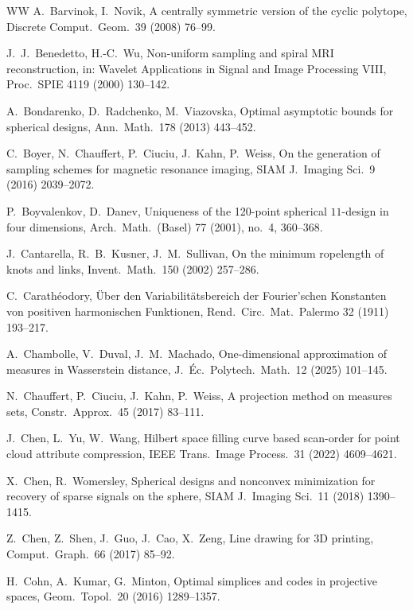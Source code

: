 \documentclass[12pt]{article}
\theoremstyle{plain}
\theoremstyle{definition}
\theoremstyle{remark}
\begin{document}
\begin{thebibliography}{WW}
A.\ Barvinok, I.\ Novik,
A centrally symmetric version of the cyclic polytope,
Discrete Comput.\ Geom.\ 39 (2008) 76--99.


J.\ J.\ Benedetto, H.-C.\ Wu,
Non-uniform sampling and spiral MRI reconstruction,
in: Wavelet Applications in Signal and Image Processing VIII,
Proc.\ SPIE 4119 (2000) 130--142.

A.\ Bondarenko, D.\ Radchenko, M.\ Viazovska,
Optimal asymptotic bounds for spherical designs,
Ann.\ Math.\ 178 (2013) 443--452.

C.\ Boyer, N.\ Chauffert, P.\ Ciuciu, J.\ Kahn, P.\ Weiss,
On the generation of sampling schemes for magnetic resonance imaging,
SIAM J.\ Imaging Sci.\ 9 (2016) 2039--2072.

P.\ Boyvalenkov, D.\ Danev,
Uniqueness of the 120-point spherical \(11\)-design in four dimensions,
Arch.\ Math.\ (Basel) 77 (2001), no.\ 4, 360--368.

J.\ Cantarella, R.\ B.\ Kusner, J.\ M.\ Sullivan,
On the minimum ropelength of knots and links,
Invent.\ Math.\ 150 (2002) 257--286.

C.\ Carath{\'e}odory,
\"Uber den Variabilit{\"a}tsbereich der Fourier'schen Konstanten von positiven harmonischen Funktionen,
Rend.\ Circ.\ Mat.\ Palermo 32 (1911) 193--217.

A.\ Chambolle, V.\ Duval, J.\ M.\ Machado,
One-dimensional approximation of measures in Wasserstein distance,
J.\ \'Ec.\ Polytech.\ Math.\ 12 (2025) 101--145.

N.\ Chauffert, P.\ Ciuciu, J.\ Kahn, P.\ Weiss,
A projection method on measures sets,
Constr.\ Approx.\ 45 (2017) 83--111.

J.\ Chen, L.\ Yu, W.\ Wang,
Hilbert space filling curve based scan-order for point cloud attribute compression,
IEEE Trans.\ Image Process.\ 31 (2022) 4609--4621.

X.\ Chen, R.\ Womersley,
Spherical designs and nonconvex minimization for recovery of sparse signals on the sphere,
SIAM J.\ Imaging Sci.\ 11 (2018) 1390--1415.

Z.\ Chen, Z.\ Shen, J.\ Guo, J.\ Cao, X.\ Zeng,
Line drawing for 3D printing,
Comput.\ Graph.\ 66 (2017) 85--92.

H.\ Cohn, A.\ Kumar, G.\ Minton,
Optimal simplices and codes in projective spaces,
Geom.\ Topol.\ 20 (2016) 1289--1357.


\end{thebibliography}
\end{document}

